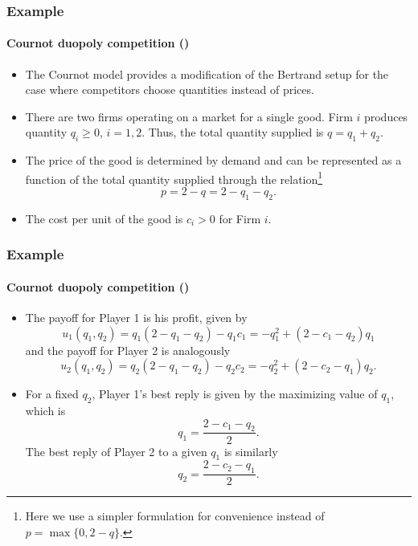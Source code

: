 \documentclass[10pt]{beamer}
\theoremstyle{definition}
\begin{document}
\begin{frame}[fragile]\setcounter{slidenum}{1}
\frametitle{Example }
\framesubtitle{Cournot duopoly competition ()}
\begin{itemize}\itemsep1em
\item The Cournot model provides a modification of the Bertrand setup for the case where competitors choose quantities instead of prices.
\item There are two firms operating on a market for a single good. Firm $ i $ produces quantity $ q_i \geq 0$, $ i=1,2 $. Thus, the total quantity supplied is $ q =  q_1 + q_2 $.
\item The price of the good is determined by demand and can be represented as a function of the total quantity supplied through the relation\footnote{Here we use a simpler formulation for convenience instead of $ p = \max\{0,2-q\} $.}
\[ p = 2 - q = 2 - q_1 - q_2. \]
\item The cost per unit of the good is $ c_i > 0 $ for Firm $ i $.
\end{itemize}
\end{frame}



\begin{frame}[fragile]
\frametitle{Example }
\framesubtitle{Cournot duopoly competition ()}
\begin{itemize}\itemsep1em
\item The payoff for Player 1 is his profit, given by 
\[ u_1(q_1,q_2) = q_1 (2-q_1-q_2) - q_1 c_1 = -q_1^2 + (2-c_1-q_2)q_1 \] and the payoff for Player 2 is analogously 
\[ u_2(q_1,q_2) = q_2 (2-q_1-q_2) - q_2 c_2 = -q_2^2 + (2-c_2-q_1)q_2 .\]
\item For a fixed $ q_2 $, Player 1's best reply is given by the maximizing value of $ q_1 $, which is \begin{equation}
q_1 = \frac{2-c_1-q_2}{2}.
\label{eq:CournotBR1}
\end{equation} The best reply of Player 2 to a given $ q_1 $ is similarly \begin{equation}
q_2 = \frac{2-c_2-q_1}{2} .
\label{eq:CournotBR2}
\end{equation} 
\end{itemize}
\end{frame}
\end{document}
